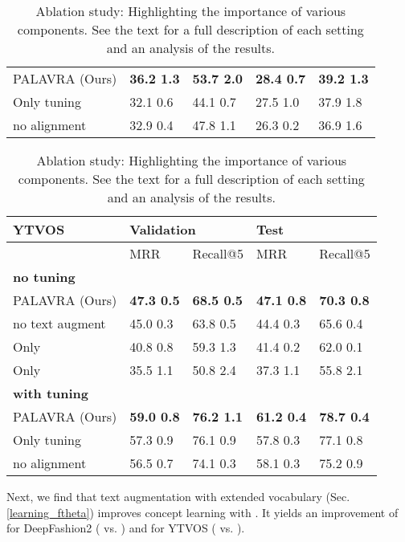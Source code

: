 \documentclass[runningheads]{llncs}
\newcommand{\secref}[1]{Sec. \ref{#1}}
\begin{document}
\begin{table}[t]
\begin{tabular}{l|ll|ll}
    PALAVRA (Ours)  &  \textbf{36.2  1.3} & \textbf{53.7  2.0}  & \textbf{28.4  0.7} & \textbf{39.2  1.3} \\
    Only tuning  &  32.1  0.6 &  44.1  0.7 &  27.5  1.0 &  37.9  1.8 \\
    no alignment  &  32.9  0.4 &  47.8  1.1 &  26.3  0.2 &  36.9  1.6 \\
    \bottomrule
\end{tabular}
\vspace{10pt}
\begin{tabular}{l|ll|ll}
    \toprule
        {YTVOS} &    \multicolumn{2}{l|}{Validation}       &    \multicolumn{2}{l}{Test} \\
    \midrule
    {} &       MRR &  Recall@5 &    MRR & Recall@5 \\
    \midrule
     {\textbf{no tuning}} &&\\
    PALAVRA (Ours)  &  \textbf{47.3  0.5} &  \textbf{68.5  0.5} &  \textbf{47.1  0.8} &  \textbf{70.3  0.8 }\\
    no text augment  &  45.0  0.3 &  63.8  0.5 &  44.4  0.3 &  65.6  0.4 \\
    Only  &  40.8  0.8 &  59.3  1.3 &  41.4  0.2 &  62.0  0.1 \\
    Only     &  35.5  1.1 &  50.8  2.4 &  37.3  1.1 &  55.8  2.1 \\
    \midrule
   {\textbf{with tuning}} &&\\
    PALAVRA (Ours)   &  \textbf{59.0  0.8} &  \textbf{76.2  1.1} &  \textbf{61.2  0.4} &  \textbf{78.7  0.4} \\
    Only tuning   &  57.3  0.9 &  76.1  0.9 &  57.8  0.3 &  77.1  0.8 \\
    no alignment &  56.5  0.7 &  74.1  0.3 &  58.1  0.3 &  75.2  0.9 \\
    \bottomrule
    \end{tabular}
    \caption{Ablation study: Highlighting the importance of various components. See the text for a full description of each setting and an analysis of the results. 
    }
    \label{tab:deep_fashion_abl}
    \vspace{-20pt}
\end{table}

Next, we find that text augmentation with extended vocabulary (\secref{learning_ftheta}) improves concept learning with . It yields an improvement of  for DeepFashion2 ( vs. ) and  for YTVOS ( vs. ).
\end{document}
